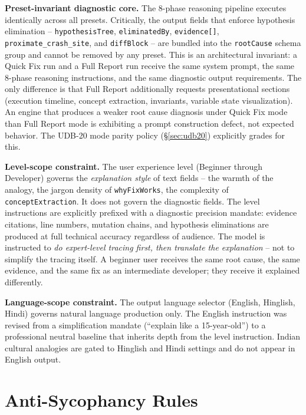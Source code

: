\documentclass[12pt,a4paper]{article}
\newcommand{\code}[1]{\texttt{\small #1}}
\begin{document}
\textbf{Preset-invariant diagnostic core.} The 8-phase reasoning pipeline executes
identically across all presets. Critically, the output fields that enforce hypothesis
elimination -- \code{hypothesisTree}, \code{eliminatedBy}, \code{evidence[]},
\code{proximate\_crash\_site}, and \code{diffBlock} -- are bundled into the \code{rootCause}
schema group and cannot be removed by any preset. This is an architectural invariant:
a Quick Fix run and a Full Report run receive the same system prompt, the same 8-phase
reasoning instructions, and the same diagnostic output requirements. The only difference
is that Full Report additionally requests presentational sections (execution timeline,
concept extraction, invariants, variable state visualization). An engine that produces
a weaker root cause diagnosis under Quick Fix mode than Full Report mode is exhibiting
a prompt construction defect, not expected behavior. The UDB-20 mode parity policy
(\S\ref{sec:udb20}) explicitly grades for this.

\textbf{Level-scope constraint.} The user experience level (Beginner through Developer)
governs the \textit{explanation style} of text fields -- the warmth of the analogy,
the jargon density of \code{whyFixWorks}, the complexity of \code{conceptExtraction}.
It does not govern the diagnostic fields. The level instructions are explicitly prefixed
with a diagnostic precision mandate: evidence citations, line numbers, mutation chains,
and hypothesis eliminations are produced at full technical accuracy regardless of
audience. The model is instructed to \textit{do expert-level tracing first, then translate
the explanation} -- not to simplify the tracing itself. A beginner user receives the same
root cause, the same evidence, and the same fix as an intermediate developer; they receive
it explained differently.

\textbf{Language-scope constraint.} The output language selector (English, Hinglish, Hindi)
governs natural language production only. The English instruction was revised from
a simplification mandate (``explain like a 15-year-old'') to a professional neutral
baseline that inherits depth from the level instruction. Indian cultural analogies are
gated to Hinglish and Hindi settings and do not appear in English output.

\section{Anti-Sycophancy Rules}
\end{document}
